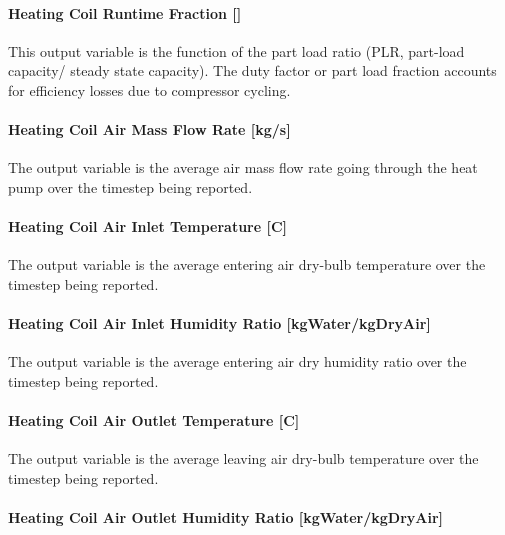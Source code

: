 \paragraph{Heating Coil Runtime Fraction {[]}}\label{heating-coil-runtime-fraction-7}

This output variable is the function of the part load ratio (PLR, part-load capacity/ steady state capacity). The duty factor or part load fraction accounts for efficiency losses due to compressor cycling.

\paragraph{Heating Coil Air Mass Flow Rate {[}kg/s{]}}\label{heating-coil-air-mass-flow-rate-kgs-1}

The output variable is the average air mass flow rate going through the heat pump over the timestep being reported.

\paragraph{Heating Coil Air Inlet Temperature {[}C{]}}\label{heating-coil-air-inlet-temperature-c-1}

The output variable is the average entering air dry-bulb temperature over the timestep being reported.

\paragraph{Heating Coil Air Inlet Humidity Ratio {[}kgWater/kgDryAir{]}}\label{heating-coil-air-inlet-humidity-ratio-kgwaterkgdryair-1}

The output variable is the average entering air dry humidity ratio over the timestep being reported.

\paragraph{Heating Coil Air Outlet Temperature {[}C{]}}\label{heating-coil-air-outlet-temperature-c-1}

The output variable is the average leaving air dry-bulb temperature over the timestep being reported.

\paragraph{Heating Coil Air Outlet Humidity Ratio {[}kgWater/kgDryAir{]}}\label{heating-coil-air-outlet-humidity-ratio-kgwaterkgdryair-1}

